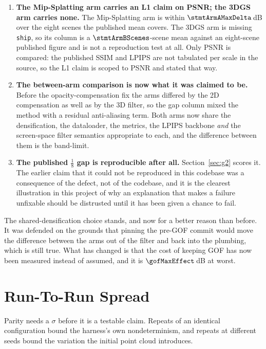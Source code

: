 \begin{enumerate}[leftmargin=1.4em,itemsep=3pt]
  \item \textbf{The Mip-Splatting arm carries an L1 claim on PSNR; the 3DGS arm carries none.} The Mip-Splatting arm is
        within $\stmtArmAMaxDelta$\,dB over the eight scenes the published mean
        covers. The 3DGS arm is missing \texttt{ship}, so its column is a
        $\stmtArmBScenes$-scene mean against an eight-scene published figure and
        is not a reproduction test at all. Only PSNR is compared: the published
        SSIM and LPIPS are not tabulated per scale in the source, so the L1
        claim is scoped to PSNR and stated that way.
  \item \textbf{The between-arm comparison is now what it was claimed to be.}
        Before the opacity-compensation fix the arms differed by the 2D compensation as
        well as by the 3D filter, so the gap column mixed the method with a
        residual anti-aliasing term. Both arms now share the densification, the
        dataloader, the metrics, the LPIPS backbone \emph{and} the screen-space
        filter semantics appropriate to each, and the difference between them is
        the band-limit.
  \item \textbf{The published $\tfrac18$ gap is reproducible after all.}
        Section~\ref{sec:g2} scores it. The earlier claim that it could not be
        reproduced in this codebase was a consequence of the defect, not of the
        codebase, and it is the clearest illustration in this project of why an
        explanation that makes a failure unfixable should be distrusted until it
        has been given a chance to fail.
\end{enumerate}

The shared-densification choice stands, and now for a better reason than before.
It was defended on the grounds that pinning the pre-GOF commit would move the
difference between the arms out of the filter and back into the plumbing, which
is still true. What has changed is that the cost of keeping GOF has now been measured instead of assumed, and it is $\gofMaxEffect$\,dB at worst.

\section{Run-To-Run Spread}
\label{sec:spread}
Parity needs a $\sigma$ before it is a testable claim. Repeats of an identical
configuration bound the harness's own nondeterminism, and repeats at different
seeds bound the variation the initial point cloud introduces.

